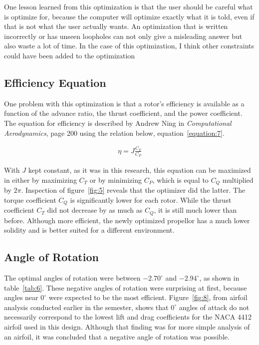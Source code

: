 \documentclass[journal ]{new-aiaa}
\begin{document}
One lesson learned from this optimization is that the user should be careful what is optimize for, because the computer will optimize exactly what it is told, even if that is not what the user actually wants. An optimization that is written incorrectly or has unseen loopholes can not only give a misleading answer but also waste a lot of time. In the case of this optimization, I think other constraints could have been added to the optimization

\subsection{Efficiency Equation}

One problem with this optimization is that a rotor's efficiency is available as a function of the advance ratio, the thrust coefficient, and the power coefficient. The equation for efficiency is described by Andrew Ning in \emph{Computational Aerodynamics}, page 200 \cite{ComAer} using the relation below, equation~\eqref{equation:7}.

\begin{equation}
	\begin{aligned}
	\label{equation:7}
	\eta = J \frac{C_{T}}{C_{P}}
	\end{aligned}
\end{equation}

With $J$ kept constant, as it was in this research, this equation can be maximized in either by maximizing $C_{T}$ or by minimizing $C_{P}$, which is equal to $C_{Q}$ multiplied by $2 \pi$. Inspection of figure~\eqref{fig:5} reveals that the optimizer did the latter. The torque coefficient $C_{Q}$ is significantly lower for each rotor. While the thrust coefficient $C_{T}$ did not decrease by as much as $C_{Q}$, it is still much lower than before. Although more efficient, the newly optimized propellor has a much lower solidity and is better suited for a different environment.

\subsection{Angle of Rotation}

The optimal angles of rotation were between $-2.70^{\circ}$ and $-2.94^{\circ}$, as shown in table~\eqref{tab:6}. These negative angles of rotation were surprising at first, because angles near $0^{\circ}$ were expected to be the most efficient. Figure~\eqref{fig:8}, from airfoil analysis conducted earlier in the semester, shows that $0^{\circ}$ angles of attack do not necessarily correspond to the lowest lift and drag coefficients for the NACA 4412 airfoil used in this design. Although that finding was for more simple analysis of an airfoil, it was concluded that a negative angle of rotation was possible.
\end{document}
